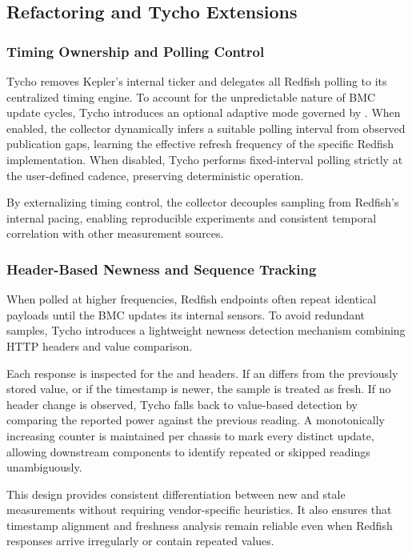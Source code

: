 \subsection{Refactoring and Tycho Extensions}
\label{subsec:redfish_refactor}
\subsubsection{Timing Ownership and Polling Control}
\label{subsubsec:redfish_timing}

Tycho removes Kepler’s internal ticker and delegates all Redfish polling to its centralized timing engine. To account for the unpredictable nature of BMC update cycles, Tycho introduces an optional adaptive mode governed by . 
When enabled, the collector dynamically infers a suitable polling interval from observed publication gaps, learning the effective refresh frequency of the specific Redfish implementation. 
When disabled, Tycho performs fixed-interval polling strictly at the user-defined cadence, preserving deterministic operation. 

By externalizing timing control, the collector decouples sampling from Redfish’s internal pacing, enabling reproducible experiments and consistent temporal correlation with other measurement sources.

\subsubsection{Header-Based Newness and Sequence Tracking}
\label{subsubsec:redfish_newness}

When polled at higher frequencies, Redfish endpoints often repeat identical payloads until the BMC updates its internal sensors.  
To avoid redundant samples, Tycho introduces a lightweight newness detection mechanism combining HTTP headers and value comparison.  

Each response is inspected for the  and  headers.  
If an  differs from the previously stored value, or if the  timestamp is newer, the sample is treated as fresh.  
If no header change is observed, Tycho falls back to value-based detection by comparing the reported power against the previous reading.  
A monotonically increasing  counter is maintained per chassis to mark every distinct update, allowing downstream components to identify repeated or skipped readings unambiguously.

This design provides consistent differentiation between new and stale measurements without requiring vendor-specific heuristics.  
It also ensures that timestamp alignment and freshness analysis remain reliable even when Redfish responses arrive irregularly or contain repeated values.

